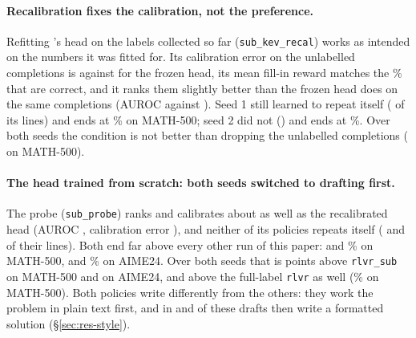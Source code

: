 \paragraph{Recalibration fixes the calibration, not the preference.} Refitting \kev{}'s head on the labels collected so
far (\texttt{sub\_kev\_recal}) works as intended on the numbers it was fitted for. Its calibration error on the
unlabelled completions is  against  for the frozen head, its mean
fill-in reward  matches the \% that are correct, and it ranks them
slightly better than the frozen head does on the same completions (AUROC  against
). Seed 1 still learned to repeat itself ( of its lines) and ends at
\% on MATH-500; seed 2 did not () and ends at
\%. Over both seeds the condition is not better than dropping the unlabelled completions
(  on MATH-500).

\paragraph{The head trained from scratch: both seeds switched to drafting first.} The probe (\texttt{sub\_probe})
ranks and calibrates about as well as the recalibrated head (AUROC , calibration error
), and neither of its policies repeats itself ( and
 of their lines). Both end far above every other run of this paper: 
and \% on MATH-500,  and \% on AIME24.
Over both seeds that is   points above
\texttt{rlvr\_sub} on MATH-500 and   on
AIME24, and above the full-label \texttt{rlvr} as well (\% on MATH-500). Both policies write
differently from the others: they work the problem in plain text first, and in  and
 of these drafts then write a formatted solution (\S\ref{sec:res-style}).

\begin{table}[t]
\centering\small
\setlength{\tabcolsep}{4.5pt}

\caption{What each final policy writes on MATH-500 (greedy): completion tokens, share truncated at 2048 tokens, share of
lines (of at least 20 characters) that repeat an earlier line of the same completion, share of completions that repeat
such a line after their first boxed answer, share with more than one boxed answer (the verifier reads the last one),
share that open with an informal draft, and \kev{}'s $\pc$ for right and for wrong answers.}
\label{tab:sub-style}
\end{table}

